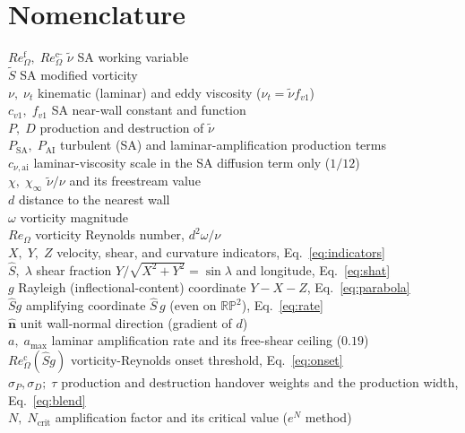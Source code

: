 \documentclass[journal]{new-aiaa}
\begin{document}
\section*{Nomenclature}
\begin{tabbing}
  $Re_\Omega^{\mathrm{f}},\;Re_\Omega^{\mathrm{c}}$\quad\quad \= \kill
  $\tilde\nu$ \> SA working variable \\
  $\tilde S$ \> SA modified vorticity \\
  $\nu,\;\nu_t$ \> kinematic (laminar) and eddy viscosity ($\nu_t=\tilde\nu f_{v1}$) \\
  $c_{v1},\;f_{v1}$ \> SA near-wall constant and function \\
  $P,\;D$ \> production and destruction of $\tilde\nu$ \\
  $P_\mathrm{SA},\;P_\mathrm{AI}$ \> turbulent (SA) and laminar-amplification production terms \\
  $c_{\nu,\mathrm{ai}}$ \> laminar-viscosity scale in the SA diffusion term only ($1/12$) \\
  $\chi,\;\chi_\infty$ \> $\tilde\nu/\nu$ and its freestream value \\
  $d$ \> distance to the nearest wall \\
  $\omega$ \> vorticity magnitude \\
  $Re_\Omega$ \> vorticity Reynolds number, $d^2\omega/\nu$ \\
  $X,\;Y,\;Z$ \> velocity, shear, and curvature indicators, Eq.~\eqref{eq:indicators} \\
  $\hat S,\;\lambda$ \> shear fraction $Y/\sqrt{X^2+Y^2}=\sin\lambda$ and longitude, Eq.~\eqref{eq:shat} \\
  $g$ \> Rayleigh (inflectional-content) coordinate $Y-X-Z$, Eq.~\eqref{eq:parabola} \\
  $\hat S g$ \> amplifying coordinate $\hat S\,g$ (even on $\mathbb{RP}^2$), Eq.~\eqref{eq:rate} \\
  $\hat{\mathbf{n}}$ \> unit wall-normal direction (gradient of $d$) \\
  $a,\;a_{\max}$ \> laminar amplification rate and its free-shear ceiling ($0.19$) \\
  $Re_\Omega^{\mathrm{c}}(\hat S g)$ \> vorticity-Reynolds onset threshold, Eq.~\eqref{eq:onset} \\
  $\sigma_P,\sigma_D;\;\tau$ \> production and destruction handover weights and the production width, Eq.~\eqref{eq:blend} \\
  $N,\;N_\mathrm{crit}$ \> amplification factor and its critical value ($e^N$ method) \\

\end{tabbing}
\end{document}
